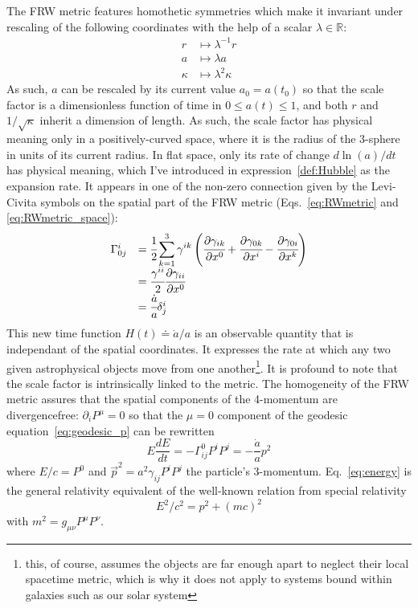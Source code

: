 The FRW metric features homothetic symmetries which make it invariant under rescaling of the following coordinates with the help of a scalar $\lambda \in \mathbb{R}$:
\begin{align*}
r &\mapsto \lambda^{-1} r\\
a &\mapsto \lambda a\\
\kappa &\mapsto \lambda^2 \kappa
\end{align*} As such, $a$ can be rescaled by its current value $a_0 = a(t_0)$ so that the scale factor is a dimensionless function of time in $0 \leq a(t) \leq 1$, and both $r$ and $1/\sqrt{\kappa}$ inherit a dimension of length. As such, the scale factor has physical meaning only in a positively-curved space, where it is the radius of the 3-sphere in units of its current radius. In flat space, only its rate of change $d \ln(a) / dt$ has physical meaning, which I've introduced in expression~\ref{def:Hubble} as the expansion rate. It appears in one of the non-zero connection given by the Levi-Civita symbols on the spatial part of the FRW metric (Eqs.~\ref{eq:RWmetric} and \ref{eq:RWmetric_space}):
\begin{equation}
\begin{array}{cl}
\Gamma^{i}_{0j} & = \cfrac{1}{2} \displaystyle\sum_{k=1}^{3} \gamma^{i k} \left( \cfrac{\partial \gamma_{i k}}{\partial x^0} + \cfrac{\partial \gamma_{0 k}}{\partial x^i} - \cfrac{\partial \gamma_{0 i}}{\partial x^k}\right) \\
& = \cfrac{\gamma^{ii}}{2} \cfrac{\partial \gamma_{ii}}{\partial x^0}\\
& = \cfrac{\dot{a}}{a} \delta^i_j
\end{array}
\end{equation} This new time function $H(t) \doteq \dot{a}/a$ is an observable quantity that is independant of the spatial coordinates. It expresses the rate at which any two given astrophysical objects move from one another\footnote{this, of course, assumes the objects are far enough apart to neglect their local spacetime metric, which is why it does not apply to systems bound within galaxies such as our solar system}. It is profound to note that the scale factor is intrinsically linked to the metric. The homogeneity of the FRW metric assures that the spatial components of the 4-momentum are divergencefree: $\partial_i P^\mu = 0$ so that the $\mu=0$ component of the geodesic equation~\ref{eq:geodesic_p} can be rewritten
\begin{equation}
\label{eq:energy}
E  \frac{dE}{dt} = - \Gamma^0_{ij} P^i P^j = - \frac{\dot{a}}{a} p^2
\end{equation} where $E/c = P^0$ and $\vec{p}^2 = a^2 \gamma_{ij} P^i P^j$ the particle's 3-momentum. Eq.~\ref{eq:energy} is the general relativity equivalent of the well-known relation from special relativity
\begin{equation}
E^2/c^2 = p^2 + (mc)^2 
\end{equation} with $m^2 = g_{\mu \nu} P^\mu P^\nu$. \\

